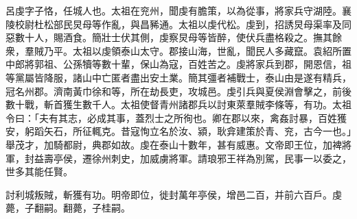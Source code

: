 \begin{pinyinscope}
 
 
 呂虔字子恪，任城人也。太祖在兖州，聞虔有膽策，以為從事，將家兵守湖陸。襄陵校尉杜松部民炅母等作亂，與昌豨通。太祖以虔代松。虔到，招誘炅母渠率及同惡數十人，賜酒食。簡壯士伏其側，虔察炅母等皆醉，使伏兵盡格殺之。撫其餘衆，羣賊乃平。太祖以虔領泰山太守。郡接山海，世亂，聞民人多藏竄。袁紹所置中郎將郭祖、公孫犢等數十輩，保山為寇，百姓苦之。虔將家兵到郡，開恩信，祖等黨屬皆降服，諸山中亡匿者盡出安土業。簡其彊者補戰士，泰山由是遂有精兵，冠名州郡。濟南黃巾徐和等，所在劫長吏，攻城邑。虔引兵與夏侯淵會擊之，前後數十戰，斬首獲生數千人。太祖使督青州諸郡兵以討東萊羣賊李條等，有功。太祖令曰：「夫有其志，必成其事，蓋烈士之所徇也。卿在郡以來，禽姦討暴，百姓獲安，躬蹈矢石，所征輒克。昔寇恂立名於汝、潁，耿弇建策於青、兖，古今一也。」舉茂才，加騎都尉，典郡如故。虔在泰山十數年，甚有威惠。文帝即王位，加裨將軍，封益壽亭侯，遷徐州刺史，加威虜將軍。請琅邪王祥為別駕，民事一以委之，世多其能任賢。
 
 
 討利城叛賊，斬獲有功。明帝即位，徙封萬年亭侯，增邑二百，并前六百戶。虔薨，子翻嗣。翻薨，子桂嗣。
 
 
\end{pinyinscope}